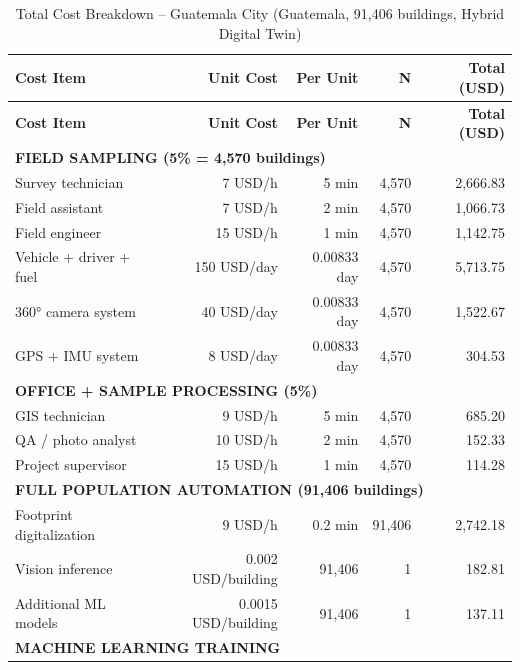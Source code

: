 \begin{longtable}{lrrrr}
\caption{Total Cost Breakdown – Guatemala City (Guatemala, 91,406 buildings, Hybrid Digital Twin)} \\
\hline
\textbf{Cost Item} & \textbf{Unit Cost} & \textbf{Per Unit} & \textbf{N} & \textbf{Total (USD)} \\
\hline
\endfirsthead

\hline
\textbf{Cost Item} & \textbf{Unit Cost} & \textbf{Per Unit} & \textbf{N} & \textbf{Total (USD)} \\
\hline
\endhead

\multicolumn{5}{l}{\textbf{FIELD SAMPLING (5\% = 4,570 buildings)}} \\

Survey technician & 7 USD/h & 5 min & 4,570 & 2,666.83 \\
Field assistant & 7 USD/h & 2 min & 4,570 & 1,066.73 \\
Field engineer & 15 USD/h & 1 min & 4,570 & 1,142.75 \\

Vehicle + driver + fuel & 150 USD/day & 0.00833 day & 4,570 & 5,713.75 \\
360° camera system & 40 USD/day & 0.00833 day & 4,570 & 1,522.67 \\
GPS + IMU system & 8 USD/day & 0.00833 day & 4,570 & 304.53 \\
\hline

\multicolumn{5}{l}{\textbf{OFFICE + SAMPLE PROCESSING (5\%)}} \\

GIS technician & 9 USD/h & 5 min & 4,570 & 685.20 \\
QA / photo analyst & 10 USD/h & 2 min & 4,570 & 152.33 \\
Project supervisor & 15 USD/h & 1 min & 4,570 & 114.28 \\
\hline

\multicolumn{5}{l}{\textbf{FULL POPULATION AUTOMATION (91,406 buildings)}} \\

Footprint digitalization & 9 USD/h & 0.2 min & 91,406 & 2,742.18 \\

Vision inference & 0.002 USD/building & 91,406 & 1 & 182.81 \\
Additional ML models & 0.0015 USD/building & 91,406 & 1 & 137.11 \\
\hline

\multicolumn{5}{l}{\textbf{MACHINE LEARNING TRAINING}} \\


\end{longtable}
